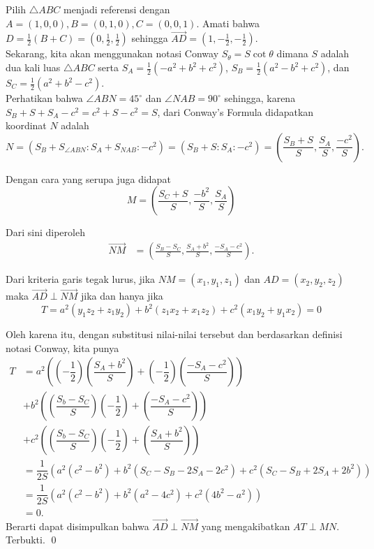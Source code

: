 Pilih $\triangle ABC$ menjadi referensi dengan $A=(1,0,0), B=(0,1,0), C=(0,0,1)$. Amati bahwa $D=\frac{1}{2}(B+C) = (0,\frac{1}{2},\frac{1}{2})$ sehingga $\overrightarrow{AD} = (1,-\frac{1}{2},-\frac{1}{2})$.\\

Sekarang, kita akan menggunakan notasi Conway $S_\theta = S \cot \theta$ dimana $S$ adalah dua kali luas $\triangle ABC$ serta $S_A = \frac{1}{2}(-a^2+b^2+c^2)$, $S_B= \frac{1}{2}(a^2-b^2+c^2)$, dan $S_C = \frac{1}{2}(a^2+b^2-c^2)$.\\

Perhatikan bahwa $\angle ABN = 45^\circ$ dan $\angle NAB = 90^\circ$ sehingga,  karena $S_B+S+S_A-c^2 = c^2 + S -c^2 = S$, dari Conway's Formula didapatkan koordinat $N$ adalah
$$N = (S_B+S_{\angle ABN} : S_A+S_{NAB} : -c^2) = (S_B+S : S_A : -c^2) = \left(\frac{S_B+S}{S}, \frac{S_A}{S}, \frac{-c^2}{S}\right).$$


Dengan cara yang serupa juga didapat
$$M = \left(\frac{S_C+S}{S}, \frac{-b^2}{S}, \frac{S_A}{S}\right)$$

Dari sini diperoleh
\begin{equation*}
\begin{split}
\overrightarrow{NM} &= \left(\frac{S_B-S_C}{S}, \frac{S_A+b^2}{S}, \frac{-S_A-c^2}{S}\right).
\end{split}
\end{equation*}

Dari kriteria garis tegak lurus, jika $NM = (x_1,y_1,z_1)$ dan $AD = (x_2,y_2,z_2)$ maka  $\overrightarrow{AD} \perp \overrightarrow{NM}$ jika dan hanya jika
$$T = a^2(y_1z_2+z_1y_2)+b^2(z_1x_2+x_1z_2)+c^2(x_1y_2+y_1x_2) = 0$$

Oleh karena itu, dengan substitusi nilai-nilai tersebut dan berdasarkan definisi notasi Conway, kita punya
\begin{equation*}
\begin{split}
T &= a^2\left(\left(-\dfrac{1}{2}\right)\left(\dfrac{S_A+b^2}{S}\right)+\left(-\dfrac{1}{2}\right)\left(\dfrac{-S_A-c^2}{S}\right)\right)\\
&+b^2\left(\left(\dfrac{S_b-S_C}{S}\right)\left(-\dfrac{1}{2}\right)+\left(\dfrac{-S_A-c^2}{S}\right)\right)\\
&+c^2\left(\left(\dfrac{S_b-S_C}{S}\right)\left(-\dfrac{1}{2}\right)+\left(\dfrac{S_A+b^2}{S}\right)\right)\\
&=\dfrac{1}{2S}\left(a^2(c^2-b^2)+b^2(S_C-S_B-2S_A-2c^2)+c^2(S_C-S_B+2S_A+2b^2)\right)\\
&=\dfrac{1}{2S}\left(a^2(c^2-b^2)+b^2(a^2-4c^2)+c^2(4b^2-a^2)\right)\\
&= 0.
\end{split}
\end{equation*}
Berarti dapat disimpulkan bahwa $\overrightarrow{AD} \perp \overrightarrow{NM}$ yang mengakibatkan $AT \perp MN$. Terbukti. \qed
